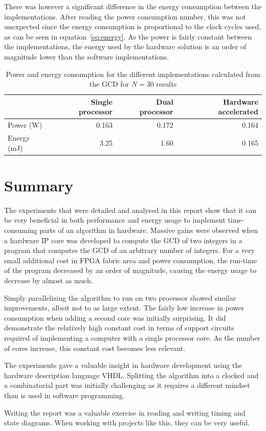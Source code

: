 \documentclass[11pt]{article}
\begin{document}
There was however a significant difference in the energy consumption between the implementations. After reading the power consumption number, this was not unexpected since the energy consumption is proportional to the clock cycles used, as can be seen in equation~\eqref{eq:energy}. As the power is fairly constant between the implementations, the energy used by the hardware solution is an order of magnitude lower than the software implementations.

\begin{table}
  \centering
  \begin{tabular}{lrrr}
    \toprule
    & Single processor  & Dual processor    & Hardware accelerated\\
    \midrule
    Power (W)   & 0.163         & 0.172         & 0.164\\

    Energy (mJ) & 3.25       & 1.60     & 0.165\\
    \bottomrule
  \end{tabular}
  \caption{Power and energy consumption for the different implementations calculated from the GCD for $N=30$ results}
  \label{tab:Power}
\end{table}

\section{Summary\label{sec:summary}}
The experiments that were detailed and analysed in this report show that it can be very beneficial in both performance and energy usage to implement time-consuming parts of an algorithm in hardware. Massive gains were observed when a hardware IP core was developed to compute the GCD of two integers in a program that computes the GCD of an arbitrary number of integers. For a very small additional cost in FPGA fabric area and power consumption, the run-time of the program decreased by an order of magnitude, causing the energy usage to decrease by almost as much.

Simply parallelizing the algorithm to run on two processor showed similar improvements, albeit not to as large extent. The fairly low increase in power consumption when adding a second core was initially surprising. It did demonstrate the relatively high constant cost in terms of support circuits required of implementing a computer with a single processor core. As the number of cores increase, this constant cost becomes less relevant.

The experiments gave a valuable insight in hardware development using the hardware description language VHDL. Splitting the algorithm into a clocked and a combinatorial part was initially challenging as it requires a different mindset than is used in software programming.

Writing the report was a valuable exercise in reading and writing timing and state diagrams. When working with projects like this, they can be very useful.

\printbibliography
\end{document}

